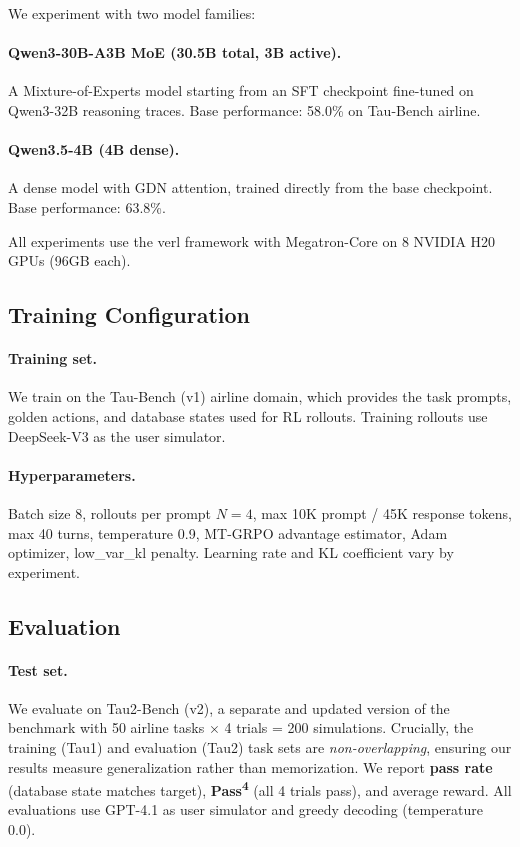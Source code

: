 \documentclass[11pt]{article}
\begin{document}
We experiment with two model families:

\paragraph{Qwen3-30B-A3B MoE (30.5B total, 3B active).} A Mixture-of-Experts model starting from an SFT checkpoint fine-tuned on Qwen3-32B reasoning traces. Base performance: 58.0\% on Tau-Bench airline.

\paragraph{Qwen3.5-4B (4B dense).} A dense model with GDN attention, trained directly from the base checkpoint. Base performance: 63.8\%.

All experiments use the verl framework \cite{sheng2024verl} with Megatron-Core on 8 NVIDIA H20 GPUs (96GB each).

\subsection{Training Configuration}

\paragraph{Training set.} We train on the Tau-Bench (v1) airline domain, which provides the task prompts, golden actions, and database states used for RL rollouts. Training rollouts use DeepSeek-V3 as the user simulator.

\paragraph{Hyperparameters.} Batch size 8, rollouts per prompt $N=4$, max 10K prompt / 45K response tokens, max 40 turns, temperature 0.9, MT-GRPO advantage estimator, Adam optimizer, low\_var\_kl penalty. Learning rate and KL coefficient vary by experiment.

\subsection{Evaluation}

\paragraph{Test set.} We evaluate on Tau2-Bench (v2), a separate and updated version of the benchmark with 50 airline tasks $\times$ 4 trials = 200 simulations. Crucially, the training (Tau1) and evaluation (Tau2) task sets are \emph{non-overlapping}, ensuring our results measure generalization rather than memorization. We report \textbf{pass rate} (database state matches target), \textbf{Pass\textsuperscript{4}} (all 4 trials pass), and average reward. All evaluations use GPT-4.1 as user simulator and greedy decoding (temperature 0.0).
\end{document}
